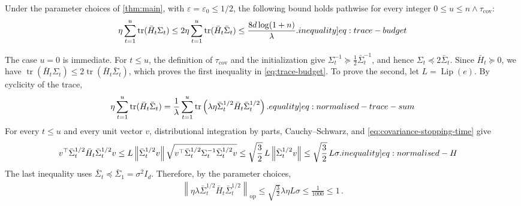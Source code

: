\documentclass[12pt,cleveref]{jmlr}
\renewenvironment{proof}[1][\proofname]
{\par\noindent{\bfseries\upshape #1\ }}
{\jmlrQED}
\newcommand{\eqlabel}[1]{\label[equality]{#1}}
\newcommand{\ineqlabel}[1]{\label[inequality]{#1}}
\newcommand{\tr}{\operatorname{tr}}
\newcommand{\Lip}{\operatorname{Lip}}
\newcommand{\op}{\mathrm{op}}
\newcommand{\1}{\mathbf 1}
\newcommand{\eps}{\varepsilon}
\newcommand{\norm}[1]{\left\lVert #1\right\rVert}
\begin{document}
\begin{lemma}
    \label{lem:trace}
    Under the parameter choices of \cref{thm:main}, with
    $\eps=\eps_0\leq1/2$, the following bound holds pathwise for every
    integer $0\leq u\leq n\wedge\tau_{\mathrm{cov}}$:
    \begin{align}
        \eta\sum_{t=1}^u\tr(\bar H_t\Sigma_t)
        \leq2\eta\sum_{t=1}^u\tr(\bar H_t\bar\Sigma_t)
        \leq\frac{8d\log(1+n)}{\lambda}.
        \ineqlabel{eq:trace-budget}
    \end{align}
\end{lemma}
\begin{proof}[Proof of \cref{lem:trace}]
    The case $u=0$ is immediate. For $t\leq u$, the definition of
    $\tau_{\mathrm{cov}}$ and the initialization give
    $\Sigma_t^{-1}\succeq\frac12\bar{\Sigma}_t^{-1}$, and hence
    $\Sigma_t\preceq2\bar{\Sigma}_t$.
    Since $\bar{H}_t\succeq0$, we have
    $\tr(\bar{H}_t\Sigma_t)\leq2\tr(\bar{H}_t\bar{\Sigma}_t)$,
    which proves the first inequality in \cref{eq:trace-budget}.
    To prove the second, let $L=\Lip(e)$.
    By cyclicity of the trace,
    \begin{align}
        \eta\sum_{t=1}^u
        \tr(\bar{H}_t\bar{\Sigma}_t)
        =
        \frac1\lambda\sum_{t=1}^u
        \tr\left(
            \lambda\eta\bar{\Sigma}_t^{1/2}\bar{H}_t
            \bar{\Sigma}_t^{1/2}
        \right).
        \eqlabel{eq:normalised-trace-sum}
    \end{align}
    For every $t\leq u$ and every unit vector $v$, distributional
    integration by parts, Cauchy--Schwarz, and
    \cref{eq:covariance-stopping-time} give
    \begin{align}
        v^\top\bar{\Sigma}_t^{1/2}\bar{H}_t
        \bar{\Sigma}_t^{1/2}v
        & \leq
        L\norm{\bar{\Sigma}_t^{1/2}v}
        \sqrt{v^\top\bar{\Sigma}_t^{1/2}
        \Sigma_t^{-1}\bar{\Sigma}_t^{1/2}v}
        \leq
        \sqrt{\frac32}\,L
        \norm{\bar{\Sigma}_t^{1/2}v}
        \leq
        \sqrt{\frac32}\,L\sigma.
        \ineqlabel{eq:normalised-H}
    \end{align}
    The last inequality uses
    $\bar{\Sigma}_t\preceq\bar{\Sigma}_1=\sigma^2I_d$.
    Therefore, by the parameter choices,
    \begin{align}
        \norm{\eta\lambda\bar{\Sigma}_t^{1/2}\bar{H}_t\bar{\Sigma}_t^{1/2}}_{\op}
        \leq
        \sqrt{\frac32}\lambda\eta L\sigma
        \leq
        \frac1{1000}
        \leq
        1\,.
    \end{align}

\end{proof}
\end{document}
